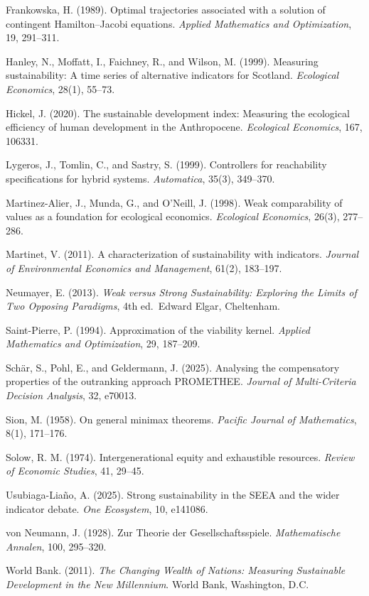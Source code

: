 \documentclass[11pt]{article}
\begin{document}
Frankowska, H. (1989). Optimal trajectories associated with a solution
of contingent Hamilton--Jacobi equations. \emph{Applied Mathematics and
Optimization}, 19, 291--311.

Hanley, N., Moffatt, I., Faichney, R., and Wilson, M. (1999). Measuring
sustainability: A time series of alternative indicators for Scotland.
\emph{Ecological Economics}, 28(1), 55--73.

Hickel, J. (2020). The sustainable development index: Measuring the
ecological efficiency of human development in the Anthropocene.
\emph{Ecological Economics}, 167, 106331.

Lygeros, J., Tomlin, C., and Sastry, S. (1999). Controllers for
reachability specifications for hybrid systems. \emph{Automatica},
35(3), 349--370.

Martinez-Alier, J., Munda, G., and O'Neill, J. (1998). Weak
comparability of values as a foundation for ecological economics.
\emph{Ecological Economics}, 26(3), 277--286.

Martinet, V. (2011). A characterization of sustainability with
indicators. \emph{Journal of Environmental Economics and Management},
61(2), 183--197.

Neumayer, E. (2013). \emph{Weak versus Strong Sustainability: Exploring
the Limits of Two Opposing Paradigms}, 4th ed.~Edward Elgar, Cheltenham.

Saint-Pierre, P. (1994). Approximation of the viability kernel.
\emph{Applied Mathematics and Optimization}, 29, 187--209.

Sch\"ar, S., Pohl, E., and Geldermann, J. (2025). Analysing the
compensatory properties of the outranking approach PROMETHEE.
\emph{Journal of Multi-Criteria Decision Analysis}, 32, e70013.

Sion, M. (1958). On general minimax theorems. \emph{Pacific Journal of
Mathematics}, 8(1), 171--176.

Solow, R. M. (1974). Intergenerational equity and exhaustible resources.
\emph{Review of Economic Studies}, 41, 29--45.

Usubiaga-Lia\~no, A. (2025). Strong sustainability in the SEEA and the
wider indicator debate. \emph{One Ecosystem}, 10, e141086.

von Neumann, J. (1928). Zur Theorie der Gesellschaftsspiele.
\emph{Mathematische Annalen}, 100, 295--320.

World Bank. (2011). \emph{The Changing Wealth of Nations: Measuring
Sustainable Development in the New Millennium}. World Bank, Washington,
D.C.
\end{document}
